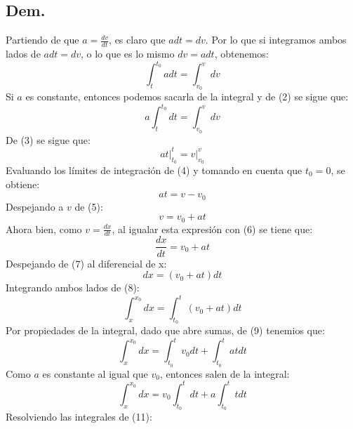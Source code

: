 \documentclass[letterpaper,12pt]{article}
\begin{document}
\begin{enumerate}
\subsection*{Dem.}
Partiendo de que $a=\tfrac{dv}{dt}$, es claro que $a dt=dv$. Por lo que si integramos ambos lados de $a dt=dv$, o lo que es lo mismo  $dv=a dt$, obtenemos:
    \begin{equation}
        \int_{t}^{t_0} a dt= \int_{v_0}^{v} dv
    \end{equation}
Si $a$ es constante, entonces podemos sacarla de la integral y de (2) se sigue que:
    \begin{equation}
        a \int_{t}^{t_0} dt= \int_{v_0}^{v} dv 
    \end{equation}
De (3) se sigue que:
    \begin{equation}
        a t \Big|_{t_0}^t = v \Big|_{v_0}^v
    \end{equation}
Evaluando los límites de integración de (4) y tomando en cuenta que $t_0 = 0$, se obtiene:
    \begin{equation}
        at = v - v_0
    \end{equation}
Despejando a $v$ de (5):
    \begin{equation}
        v = v_0 + at
    \end{equation}
Ahora bien, como $v=\tfrac{dx}{dt}$, al igualar esta expresión con (6) se tiene que:
    \begin{equation}
        \frac{dx}{dt} = v_0 + at
    \end{equation}
Despejando de (7) al diferencial de x:
    \begin{equation}
        dx = (v_0 + at) dt
    \end{equation}
Integrando ambos lados de (8):
    \begin{equation}
        \int_{x}^{x_0} dx = \int_{t_0}^{t} (v_0 + at) dt 
    \end{equation}
Por propiedades de la integral, dado que abre sumas, de (9) tenemios que:
    \begin{equation}
        \int_{x}^{x_0} dx = \int_{t_0}^{t} v_0 dt +  \int_{t_0}^{t}at dt 
    \end{equation}
Como $a$ es constante al igual que $v_0$, entonces salen de la integral:
    \begin{equation}
        \int_{x}^{x_0} dx = v_0\int_{t_0}^{t} dt +  a\int_{t_0}^{t}t dt 
    \end{equation}
Resolviendo las integrales de (11):
    \begin{equation}

\end{equation}
\end{enumerate}
\end{document}
